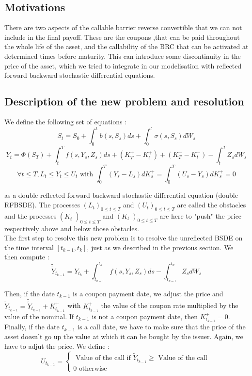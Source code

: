 \documentclass[a4paper,11pt,english]{book}
\begin{document}
\subsection{Motivations}
There are two aspects of the callable barrier reverse convertible that we can not include in the final payoff. These are the coupons ,that can be paid throughout the whole life of the asset, and the callability of the BRC that can be activated at determined times before maturity. This can introduce some discontinuity in the price of the asset, which we tried to integrate in our modelisation with reflected forward backward stochastic differential equations.
\subsection{Description of the new problem and resolution}
We define the following set of equations :
$$S_{t}=S_{0} + \int_{0}^{t}b(s,S_{s})ds + \int_{0}^{t}\sigma(s,S_{s})dW_{s}$$
$$Y_{t}=\Phi(S_{T})+\int_{t}^{T}f(s,Y_{s},Z_{s})ds+(K_{T}^{+}-K_{t}^{+})+(K_{T}^{-}-K_{t}^{-})-\int_{t}^{T}Z_{s}dW_{s}$$
$$\forall t\leq T, L_{t}\leq Y_{t}\leq U_{t} \text{ with } \int_{0}^{T}(Y_{s}-L_{s})dK_{s}^{+}=\int_{0}^{T}(U_{s}-Y_{s})dK_{s}^{+}=0$$

as a double reflected forward backward stochastic differential equation (double RFBSDE).
The processes $(L_{t})_{0\leq t \leq T}$ and $(U_{t})_{0\leq t \leq T}$ are called the obstacles and the processes $(K_{t}^{+})_{0\leq t \leq T}$ and $(K_{t}^{-})_{0\leq t \leq T}$ are here to "push" the price respectively above and below those obstacles. \\

The first step to resolve this new problem is to resolve the unreflected BSDE on the time interval $[t_{k-1},t_{k}]$, just as we described in the previous section. We then compute : $$\widetilde{\widetilde{Y}}_{t_{k-1}}=Y_{t_{k}}+\int_{t_{k-1}}^{t_{k}}f(s,Y_{s},Z_{s})ds-\int_{t_{k-1}}^{t_{k}}Z_{s}dW_{s}$$

Then, if the date $t_{k-1}$ is a coupon payment date, we adjust the price and $\widetilde{Y}_{t_{k-1}}= \widetilde{\widetilde{Y}}_{t_{k-1}} + K_{t_{k-1}}^{+}$ with $K_{t_{k-1}}^{+}$ the value of the coupon rate multiplied by the value of the nominal. If $t_{k-1}$ is not a coupon payment date, then $K_{t_{k-1}}^{+}=0$. \\
Finally, if the date $t_{k-1}$ is a call date, we have to make sure that the price of the asset doesn't go up the value at which it can be bought by the issuer. Again, we have to adjut the price. We define :
$$U_{t_{k-1}}=\left\{
    \begin{array}{ll}
        \text{ Value of the call if } \widetilde{Y}_{t_{k-1}}\geq \text{ Value of the call }\\
        0 \text{ otherwise }
    \end{array}
\right.$$
\end{document}
